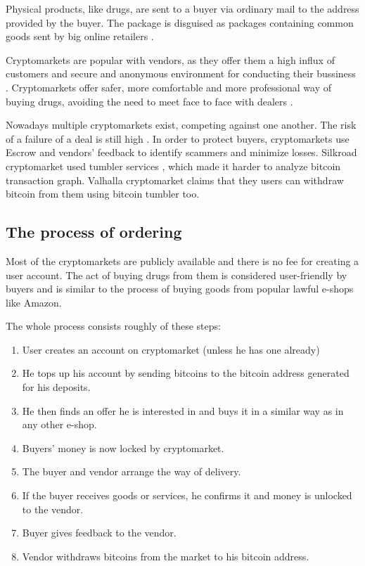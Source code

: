 \documentclass[
  digital, %
  table,   %
  lof,     %
  lot,     %
  oneside
]{fithesis3}
\begin{document}
Physical products, like drugs, are sent to a buyer via ordinary mail to the address provided by the buyer.
The package is disguised as packages containing common goods sent by big online retailers
\cite{paquet2017cryptomarkets}.

Cryptomarkets are popular with vendors,
as they offer them a high influx of customers and secure and anonymous environment for conducting their bussiness \cite{van2014responsible}.
Cryptomarkets offer safer, more comfortable and more professional way of buying drugs, avoiding 
the need to meet face to face with dealers \cite{barratt2014use}.

Nowadays multiple cryptomarkets exist, competing against one another. The risk
of a failure of a deal is still high \cite{wehinger2011dark}.
In order to protect buyers, cryptomarkets use Escrow and vendors' feedback to identify scammers and minimize losses.
Silkroad cryptomarket used tumbler services \cite{ron2014did},
which made it harder to analyze bitcoin transaction graph. Valhalla cryptomarket claims that they
users can withdraw bitcoin from them using bitcoin tumbler too.

\subsection{The process of ordering}
Most of the cryptomarkets are publicly available and there is no fee
for creating a user account. The act of buying drugs from them is considered user-friendly by buyers and is similar
to the process of buying goods from popular lawful e-shops like Amazon.

 The whole process consists roughly of these steps:
\begin{enumerate}
\item User creates an account on cryptomarket (unless he has one already)
\item He tops up his account by sending bitcoins to the bitcoin address generated for his deposits.
\item He then finds an offer he is interested in and buys it in a similar way as in any other e-shop.
\item Buyers' money is now locked by cryptomarket.
\item The buyer and vendor arrange the way of delivery.
\item If the buyer receives goods or services, he confirms it and money is unlocked to the vendor.
\item Buyer gives feedback to the vendor. 
\item Vendor withdraws bitcoins from the market to his bitcoin address.
\end{enumerate}
\end{document}
